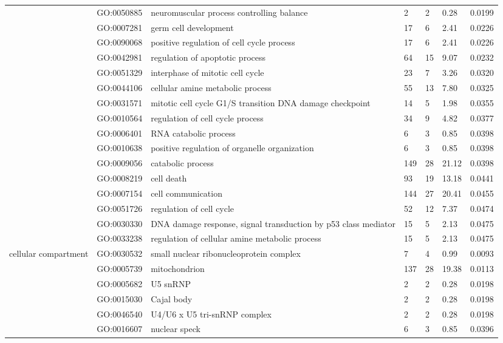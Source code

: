 \documentclass[10pt]{bmc_article}
\newenvironment{bmcformat}{\begin{raggedright}\baselineskip20pt\sloppy\setboolean{publ}{false}}{\end{raggedright}\baselineskip20pt\sloppy}
\begin{document}
\begin{bmcformat}
\begin{longtable}{p{1.7cm}lp{4.5cm}p{1cm}p{1cm}ll}
   & GO:0050885 & neuromuscular process controlling balance &   2 &   2 & 0.28 & 0.0199 \\ 
   & GO:0007281 & germ cell development &  17 &   6 & 2.41 & 0.0226 \\ 
   & GO:0090068 & positive regulation of cell cycle process &  17 &   6 & 2.41 & 0.0226 \\ 
   & GO:0042981 & regulation of apoptotic process &  64 &  15 & 9.07 & 0.0232 \\ 
   & GO:0051329 & interphase of mitotic cell cycle &  23 &   7 & 3.26 & 0.0320 \\ 
   & GO:0044106 & cellular amine metabolic process &  55 &  13 & 7.80 & 0.0325 \\ 
   & GO:0031571 & mitotic cell cycle G1/S transition DNA damage checkpoint &  14 &   5 & 1.98 & 0.0355 \\ 
   & GO:0010564 & regulation of cell cycle process &  34 &   9 & 4.82 & 0.0377 \\ 
   & GO:0006401 & RNA catabolic process &   6 &   3 & 0.85 & 0.0398 \\ 
   & GO:0010638 & positive regulation of organelle organization &   6 &   3 & 0.85 & 0.0398 \\ 
   & GO:0009056 & catabolic process & 149 &  28 & 21.12 & 0.0398 \\ 
   & GO:0008219 & cell death &  93 &  19 & 13.18 & 0.0441 \\ 
   & GO:0007154 & cell communication & 144 &  27 & 20.41 & 0.0455 \\ 
   & GO:0051726 & regulation of cell cycle &  52 &  12 & 7.37 & 0.0474 \\ 
   & GO:0030330 & DNA damage response, signal transduction by p53 class mediator &  15 &   5 & 2.13 & 0.0475 \\ 
   & GO:0033238 & regulation of cellular amine metabolic process &  15 &   5 & 2.13 & 0.0475 \\ 
   \hline
cellular compartment & GO:0030532 & small nuclear ribonucleoprotein complex &   7 &   4 & 0.99 & 0.0093 \\ 
   & GO:0005739 & mitochondrion & 137 &  28 & 19.38 & 0.0113 \\ 
   & GO:0005682 & U5 snRNP &   2 &   2 & 0.28 & 0.0198 \\ 
   & GO:0015030 & Cajal body &   2 &   2 & 0.28 & 0.0198 \\ 
   & GO:0046540 & U4/U6 x U5 tri-snRNP complex &   2 &   2 & 0.28 & 0.0198 \\ 
   & GO:0016607 & nuclear speck &   6 &   3 & 0.85 & 0.0396 \\ 
   \hline
\hline
\end{longtable}
\newpage


\end{bmcformat}
\end{document}
